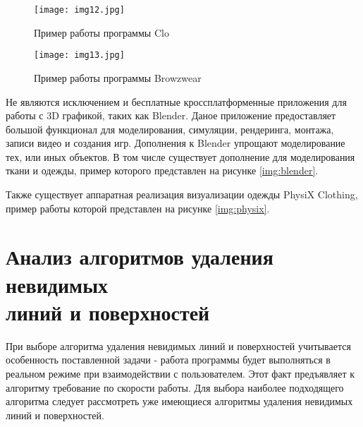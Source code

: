 \begin{figure}[ht!]
\begin{center}
    \begin{minipage}[h]{0.4\linewidth}
        \begin{center}
            \texttt{[image: img12.jpg]}
            \caption{Пример работы программы Clo}
            \label{img:Clo}
        \end{center}
    \end{minipage}
    \hspace{2ex}
    \begin{minipage}[h]{0.4\linewidth}
        \begin{center}
            \texttt{[image: img13.jpg]}
            \caption{Пример работы программы Browzwear}
            \label{img:Browzwear}
        \end{center}
    \end{minipage}
\end{center}
\end{figure}

Не являются исключением и бесплатные кроссплатформенные приложения для работы с
3D графикой, таких как Blender. Даное приложение предоставляет большой
функционал для моделирования, симуляции, рендеринга, монтажа, записи видео и
создания игр. Дополнения к Blender упрощают моделирование тех, или иных
объектов. В том числе существует дополнение для моделирования ткани и одежды,
пример которого представлен на рисунке \ref{img:blender}.


Также существует аппаратная реализация визуализации одежды PhysiX
Clothing\cite{site03}, пример работы которой представлен на рисунке
\ref{img:physix}.


\section{Анализ алгоритмов удаления невидимых\\линий и поверхностей}

При выборе алгоритма удаления невидимых линий и поверхностей учитывается
особенность поставленной задачи - работа программы будет выполняться в реальном
режиме при взаимодействии с пользователем. Этот факт предъявляет к алгоритму
требование по скорости работы. Для выбора наиболее подходящего алгоритма
следует рассмотреть уже имеющиеся алгоритмы удаления невидимых линий и
поверхностей.

